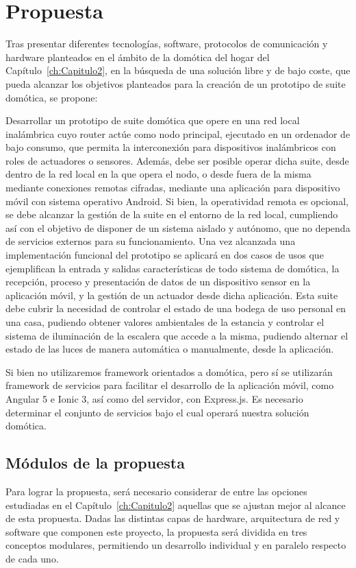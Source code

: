 \cleardoublepage

\chapter{Propuesta}
\label{ch:Capitulo3}

Tras presentar diferentes tecnologías, software, protocolos de comunicación y hardware planteados en el ámbito de la domótica del hogar del Capítulo~\ref{ch:Capitulo2}, en la búsqueda de una solución libre y de bajo coste, que pueda alcanzar los objetivos planteados para la creación de un prototipo de suite domótica, se propone:

\vspace{1cm}

Desarrollar un prototipo de suite domótica que opere en una red local inalámbrica cuyo router actúe como nodo principal, ejecutado en un ordenador de bajo consumo, que permita la interconexión para dispositivos inalámbricos con roles de actuadores o sensores. Además, debe ser posible operar dicha suite, desde dentro de la red local en la que opera el nodo, o desde fuera de la misma mediante conexiones remotas cifradas, mediante una aplicación para dispositivo móvil con sistema operativo Android. Si bien, la operatividad remota es opcional, se debe alcanzar la gestión de la suite en el entorno de la red local, cumpliendo así con el objetivo de disponer de un sistema aislado y autónomo, que no dependa de servicios externos para su funcionamiento. Una vez alcanzada una implementación funcional del prototipo se aplicará en dos casos de usos que ejemplifican la entrada y salidas características de todo sistema de domótica, la recepción, proceso y presentación de datos de un dispositivo sensor en la aplicación móvil, y la gestión de un actuador desde dicha aplicación. Esta suite debe cubrir la necesidad de controlar el estado de una bodega de uso personal en una casa, pudiendo obtener valores ambientales de la estancia y controlar el sistema de iluminación de la escalera que accede a la misma, pudiendo alternar el estado de las luces de manera automática o manualmente, desde la aplicación.


Si bien no utilizaremos \gls{framework} orientados a domótica, pero sí se utilizarán \gls{framework} de servicios para facilitar el desarrollo de la aplicación móvil, como Angular 5 e Ionic 3, así como del servidor, con Express.js. Es necesario determinar el conjunto de servicios bajo el cual operará nuestra solución domótica.


\section{Módulos de la propuesta}
\label{ch:Capitulo3.1}
Para lograr la propuesta, será necesario considerar de entre las opciones estudiadas en el Capítulo~\ref{ch:Capitulo2} aquellas que se ajustan mejor al alcance de esta propuesta. Dadas las distintas capas de hardware, arquitectura de red y software que componen este proyecto, la propuesta será dividida en tres conceptos modulares, permitiendo un desarrollo individual y en paralelo respecto de cada uno.

